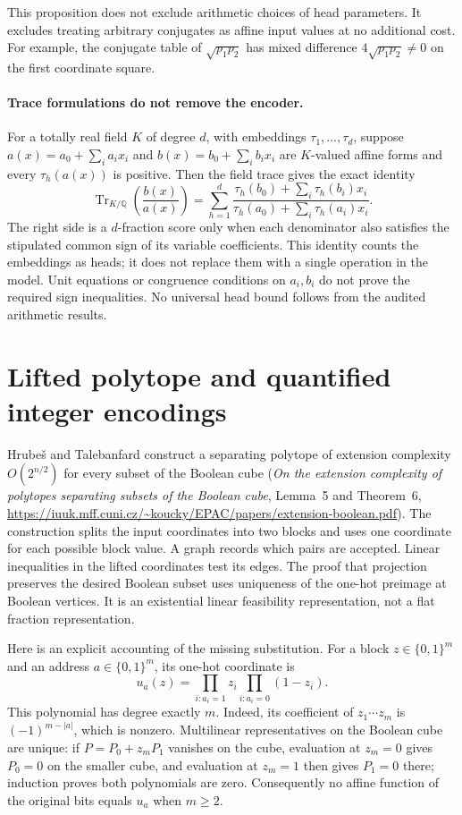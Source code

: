 \documentclass[11pt]{article}
\begin{document}
This proposition does not exclude arithmetic choices of head
parameters. It excludes treating arbitrary conjugates as affine
input values at no additional cost. For example, the conjugate table
of $\sqrt{p_1p_2}$ has mixed difference
$4\sqrt{p_1p_2}\ne0$ on the first coordinate square.

\paragraph{Trace formulations do not remove the encoder.}
For a totally real field $K$ of degree $d$, with embeddings
$\tau_1,\ldots,\tau_d$, suppose
$a(x)=a_0+\sum_i a_i x_i$ and $b(x)=b_0+\sum_i b_i x_i$ are
$K$-valued affine forms and every $\tau_h(a(x))$ is positive.
Then the field trace gives the exact identity
\[
 \operatorname{Tr}_{K/\mathbb Q}\!\left(\frac{b(x)}{a(x)}\right)
 =\sum_{h=1}^d\frac{\tau_h(b_0)+\sum_i\tau_h(b_i)x_i}
                       {\tau_h(a_0)+\sum_i\tau_h(a_i)x_i}.
\]
The right side is a $d$-fraction score only when each denominator also
satisfies the stipulated common sign of its variable coefficients.
This identity counts the embeddings as heads; it does not replace
them with a single operation in the model. Unit equations or congruence
conditions on $a_i,b_i$ do not prove the required sign inequalities.
No universal head bound follows from the audited arithmetic results.

\section{Lifted polytope and quantified integer encodings}

Hrube\v{s} and Talebanfard construct a separating polytope of extension
complexity $O(2^{n/2})$ for every subset of the Boolean cube
(\emph{On the extension complexity of polytopes separating subsets of the
Boolean cube}, Lemma~5 and Theorem~6,
\url{https://iuuk.mff.cuni.cz/~koucky/EPAC/papers/extension-boolean.pdf}).
The construction splits the input coordinates into two blocks and uses
one coordinate for each possible block value. A graph records which pairs
are accepted. Linear inequalities in the lifted coordinates test its edges.
The proof that projection preserves the desired Boolean subset uses
uniqueness of the one-hot preimage at Boolean vertices. It is an existential
linear feasibility representation, not a flat fraction representation.

Here is an explicit accounting of the missing substitution. For a block
$z\in\{0,1\}^m$ and an address $a\in\{0,1\}^m$, its one-hot coordinate is
\[
 u_a(z)=\prod_{i:a_i=1}z_i\prod_{i:a_i=0}(1-z_i).
\]
This polynomial has degree exactly $m$. Indeed, its coefficient of
$z_1\cdots z_m$ is $(-1)^{m-|a|}$, which is nonzero. Multilinear
representatives on the Boolean cube are unique: if
$P=P_0+z_mP_1$ vanishes on the cube, evaluation at $z_m=0$ gives
$P_0=0$ on the smaller cube, and evaluation at $z_m=1$ then gives
$P_1=0$ there; induction proves both polynomials are zero.
Consequently no affine function of the original bits equals $u_a$
when $m\ge2$.
\end{document}
